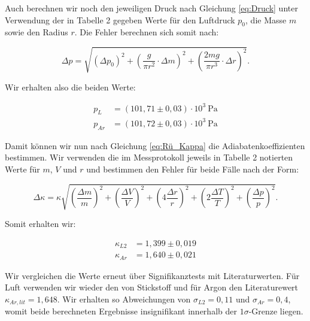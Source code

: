 \documentclass{article}
\begin{document}
Auch berechnen wir noch den jeweiligen Druck nach Gleichung \ref{eq:Druck} unter Verwendung der in Tabelle 2 gegeben Werte für den Luftdruck $p_0$, die Masse $m$ sowie den Radius $r$. Die Fehler berechnen sich somit nach:

\begin{equation}
    \Delta p = \sqrt{\left( \Delta p_0 \right)^2 + \left( \frac{g}{\pi r^2} \cdot \Delta m \right)^2 + \left( \frac{2mg}{\pi r^3} \cdot \Delta r \right)^2}.
\end{equation} 

Wir erhalten also die beiden Werte:

\begin{equation}
    \begin{split}
        p_L &= (101,71 \pm 0,03) \cdot 10^3 \ \text{Pa} \\
        p_{Ar} &= (101,72 \pm 0,03) \cdot 10^3 \ \text{Pa}
    \end{split}
\end{equation}

Damit können wir nun nach Gleichung \ref{eq:Rü_Kappa} die Adiabatenkoeffizienten bestimmen. Wir verwenden die im Messprotokoll jeweils in Tabelle 2 notierten Werte für $m$, $V$ und $r$ und bestimmen den Fehler für beide Fälle nach der Form:

\begin{equation}
    \Delta \kappa = \kappa \sqrt{\left( \frac{\Delta m}{m} \right)^2 + \left( \frac{\Delta V}{V} \right)^2 + \left( 4 \frac{\Delta r}{r} \right)^2 + \left( 2 \frac{\Delta T}{T} \right)^2 + \left( \frac{\Delta p}{p} \right)^2}.
\end{equation}

Somit erhalten wir:

\begin{equation}
    \begin{split}
        \kappa_{L2} &= 1,399 \pm 0,019 \\
        \kappa_{Ar} &= 1,640 \pm 0,021
    \end{split}
\end{equation}

Wir vergleichen die Werte erneut über Signifikanztests mit Literaturwerten. Für Luft verwenden wir wieder den von Stickstoff und für Argon den Literaturewert $\kappa_{Ar,lit} = 1,648$. Wir erhalten so Abweichungen von $\sigma_{L2} = 0,11$ und $\sigma_{Ar} = 0,4$, womit beide berechneten Ergebnisse insignifikant innerhalb der $1\sigma$-Grenze liegen.


\newpage
\end{document}
